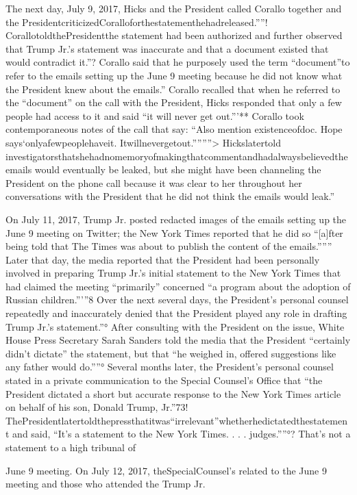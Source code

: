 The next day, July 9, 2017, Hicks and the President called Corallo together and the PresidentcriticizedCoralloforthestatementhehadreleased.””!
CorallotoldthePresidentthe statement had been authorized and further observed that Trump Jr.'s statement was inaccurate and that a document existed that would contradict it.”?
Corallo said that he purposely used the term “document”to refer to the emails setting up the June 9 meeting because he did not know what the President knew about the emails.”
Corallo recalled that when he referred to the “document” on the call with the President, Hicks responded that only a few people had access to it and said “it will never get out.”'**
Corallo took contemporaneous notes of the call that say: “Also mention existenceofdoc. Hope says‘onlyafewpeoplehaveit. Itwillnevergetout.””””>
Hickslatertold investigatorsthatshehadnomemoryofmakingthatcommentandhadalwaysbelievedtheemails would eventually be leaked, but she might have been channeling the President on the phone call because it was clear to her throughout her conversations with the President that he did not think the emails would leak.”

On July 11, 2017, Trump Jr. posted redacted images of the emails setting up the June 9 meeting on Twitter; the New York Times reported that he did so “[a]fter being told that The Times was about to publish the content of the emails.”””
Later that day, the media reported that the President had been personally involved in preparing Trump Jr.'s initial statement to the New York Times that had claimed the meeting “primarily” concerned “a program about the adoption of Russian children.”'”8
Over the next several days, the President's personal counsel repeatedly and inaccurately denied that the President played any role in drafting Trump Jr.'s statement.”°
After consulting with the President on the issue, White House Press Secretary Sarah Sanders told the media that the President “certainly didn't dictate” the statement, but that “he weighed in, offered suggestions like any father would do.””°
Several months later, the President's personal counsel stated in a private communication to the Special Counsel's Office that “the President dictated a short but accurate response to the New York Times article on behalf of his son, Donald Trump,
Jr.”73!
ThePresidentlatertoldthepressthatitwas“irrelevant”whetherhedictatedthestatement
and said, “It's a statement to the New York Times. . . . judges.””°?
That's not a statement to a high tribunal of

June 9 meeting.
On July 12, 2017, theSpecialCounsel's
related to the June 9 meeting and those who attended the
Trump Jr.

